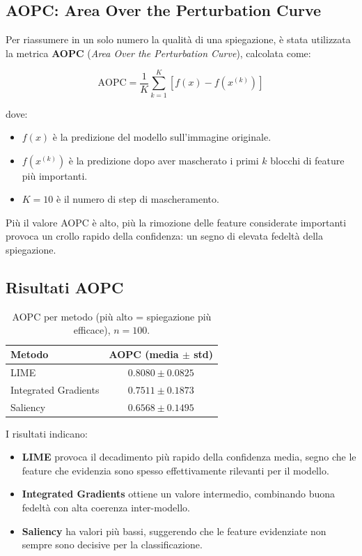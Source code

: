 \documentclass{article}
\begin{document}
\subsection{AOPC: Area Over the Perturbation Curve}
Per riassumere in un solo numero la qualità di una spiegazione, è stata
utilizzata la metrica \textbf{AOPC} (\emph{Area Over the Perturbation Curve}),
calcolata come:

\[
      \mathrm{AOPC} = \frac{1}{K} \sum_{k=1}^K \left[ f(x) - f(x^{(k)}) \right]
\]

dove:
\begin{itemize}
      \item $f(x)$ è la predizione del modello sull’immagine originale.
      \item $f(x^{(k)})$ è la predizione dopo aver mascherato i primi $k$ blocchi di feature più importanti.
      \item $K=10$ è il numero di step di mascheramento.
\end{itemize}

Più il valore AOPC è alto, più la rimozione delle feature considerate
importanti provoca un crollo rapido della confidenza: un segno di elevata
fedeltà della spiegazione.

\subsection{Risultati AOPC}
\begin{table}[h!]
      \centering
      \renewcommand{\arraystretch}{1.1}
      \begin{tabular}{lc}
            \hline
            \textbf{Metodo}      & \textbf{AOPC (media $\pm$ std)} \\
            \hline
            LIME                 & $0.8080 \pm 0.0825$             \\
            Integrated Gradients & $0.7511 \pm 0.1873$             \\
            Saliency             & $0.6568 \pm 0.1495$             \\
            \hline
      \end{tabular}
      \caption{AOPC per metodo (più alto = spiegazione più efficace), $n=100$.}
      \label{tab:aopc_results}
\end{table}

\noindent
I risultati indicano:
\begin{itemize}
      \item \textbf{LIME} provoca il decadimento più rapido della confidenza media, segno che le feature che evidenzia sono spesso effettivamente rilevanti per il modello.
      \item \textbf{Integrated Gradients} ottiene un valore intermedio, combinando buona fedeltà con alta coerenza inter-modello.
      \item \textbf{Saliency} ha valori più bassi, suggerendo che le feature evidenziate non sempre sono decisive per la classificazione.
\end{itemize}
\end{document}
